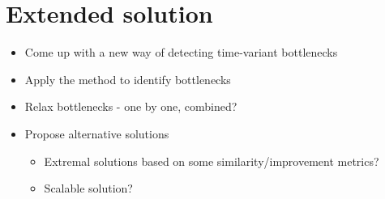 \section{Extended solution}

\begin{itemize}
    \item Come up with a new way of detecting time-variant bottlenecks
    \item Apply the method to identify bottlenecks
    \item Relax bottlenecks - one by one, combined?
    \item Propose alternative solutions
    \begin{itemize}
        \item Extremal solutions based on some similarity/improvement metrics?
        \item Scalable solution?
    \end{itemize}
\end{itemize}

